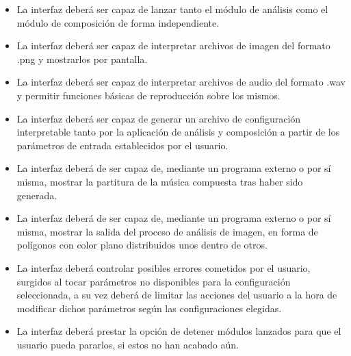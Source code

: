 	 \begin{itemize}
		 \item La interfaz deberá ser capaz de lanzar tanto el módulo de análisis como el módulo de composición de forma independiente.
		 \item La interfaz deberá ser capaz de interpretar archivos de imagen del formato .png y mostrarlos por pantalla.
		 \item La interfaz deberá ser capaz de interpretar archivos de audio del formato .wav y permitir funciones básicas de reproducción sobre los mismos.
		 \item La interfaz deberá ser capaz de generar un archivo de configuración interpretable tanto por la aplicación de análisis y composición a partir de los parámetros de entrada establecidos por el usuario.
		 \item La interfaz deberá de ser capaz de, mediante un programa externo o por sí misma, mostrar la partitura de la música compuesta tras haber sido generada.
		 \item La interfaz deberá de ser capaz de, mediante un programa externo o por sí misma, mostrar la salida del proceso de análisis de imagen, en forma de polígonos con color plano distribuidos unos dentro de otros.
		 \item La interfaz deberá controlar posibles errores cometidos por el usuario, surgidos al tocar parámetros no disponibles para la configuración seleccionada, a su vez deberá de limitar las acciones del usuario a la hora de modificar dichos parámetros según las configuraciones elegidas.
		 \item La interfaz deberá prestar la opción de detener módulos lanzados para que el usuario pueda pararlos, si estos no han acabado aún.
	 \end{itemize}
 
